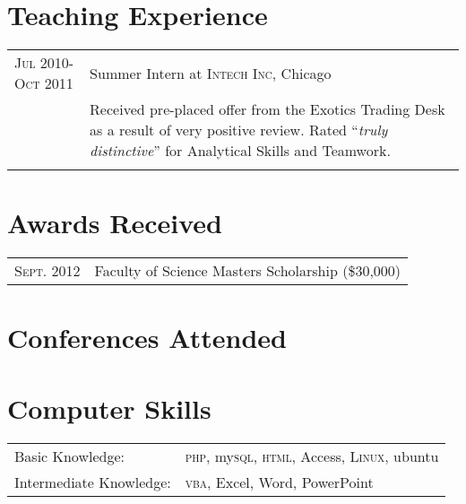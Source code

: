 \documentclass[letterpaper,10pt]{article} %
\begin{document}
\section{Teaching Experience}
\noindent 
\begin{tabular}{R{3cm}|p{13cm}} 

\textsc{Jul 2010-Oct 2011} & Summer Intern at \textsc{Intech Inc}, Chicago \emph{}\\
& \footnotesize{Received pre-placed offer from the Exotics Trading Desk as a result of very positive review. Rated ``\emph{truly distinctive}'' for Analytical Skills and Teamwork.}\\
 \\


\end{tabular}




\section{Awards Received}
\noindent 
\begin{tabular}{R{3cm}|p{13cm}} 

\textsc{Sept.} 2012 & Faculty of Science Masters Scholarship \footnotesize(\$30,000)\normalsize\\

\end{tabular}




\section{Conferences Attended}


\section{Computer Skills}
\noindent 
\begin{tabular}{R{3cm}|p{13cm}} 

Basic Knowledge: & \textsc{php}, my\textsc{sql}, \textsc{html}, Access, \textsc{Linux}, ubuntu\\

Intermediate Knowledge: & \textsc{vba}, Excel, Word, PowerPoint\\

\end{tabular}
\end{document}
